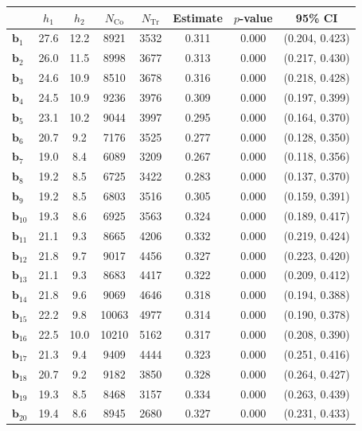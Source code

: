 \documentclass[10pt]{article}
\newcommand{\bb}{\mathbf{b}}
\begin{document}
\begin{table}[p]
    \centering
\begin{tabular}{lccccccc}
  \toprule\toprule
   & $h_1$ & $h_2$ & $N_{\mathrm{Co}}$ & $N_{\mathrm{Tr}}$ & Estimate & $p$-value & 95\% CI \\
  \midrule
   $\bb_{1}$ & 27.6 & 12.2 & 8921 & 3532 & 0.311 & 0.000 & (0.204, 0.423)\\
   $\bb_{2}$ & 26.0 & 11.5 & 8998 & 3677 & 0.313 & 0.000 & (0.217, 0.430)\\
   $\bb_{3}$ & 24.6 & 10.9 & 8510 & 3678 & 0.316 & 0.000 & (0.218, 0.428)\\
   $\bb_{4}$ & 24.5 & 10.9 & 9236 & 3976 & 0.309 & 0.000 & (0.197, 0.399)\\
   $\bb_{5}$ & 23.1 & 10.2 & 9044 & 3997 & 0.295 & 0.000 & (0.164, 0.370)\\
   $\bb_{6}$ & 20.7 & 9.2 & 7176 & 3525 & 0.277 & 0.000 & (0.128, 0.350)\\
   $\bb_{7}$ & 19.0 & 8.4 & 6089 & 3209 & 0.267 & 0.000 & (0.118, 0.356)\\
   $\bb_{8}$ & 19.2 & 8.5 & 6725 & 3422 & 0.283 & 0.000 & (0.137, 0.370)\\
   $\bb_{9}$ & 19.2 & 8.5 & 6803 & 3516 & 0.305 & 0.000 & (0.159, 0.391)\\
   $\bb_{10}$ & 19.3 & 8.6 & 6925 & 3563 & 0.324 & 0.000 & (0.189, 0.417)\\
   $\bb_{11}$ & 21.1 & 9.3 & 8665 & 4206 & 0.332 & 0.000 & (0.219, 0.424)\\
   $\bb_{12}$ & 21.8 & 9.7 & 9017 & 4456 & 0.327 & 0.000 & (0.223, 0.420)\\
   $\bb_{13}$ & 21.1 & 9.3 & 8683 & 4417 & 0.322 & 0.000 & (0.209, 0.412)\\
   $\bb_{14}$ & 21.8 & 9.6 & 9069 & 4646 & 0.318 & 0.000 & (0.194, 0.388)\\
   $\bb_{15}$ & 22.2 & 9.8 & 10063 & 4977 & 0.314 & 0.000 & (0.190, 0.378)\\
   $\bb_{16}$ & 22.5 & 10.0 & 10210 & 5162 & 0.317 & 0.000 & (0.208, 0.390)\\
   $\bb_{17}$ & 21.3 & 9.4 & 9409 & 4444 & 0.323 & 0.000 & (0.251, 0.416)\\
   $\bb_{18}$ & 20.7 & 9.2 & 9182 & 3850 & 0.328 & 0.000 & (0.264, 0.427)\\
   $\bb_{19}$ & 19.3 & 8.5 & 8468 & 3157 & 0.334 & 0.000 & (0.263, 0.439)\\
   $\bb_{20}$ & 19.4 & 8.6 & 8945 & 2680 & 0.327 & 0.000 & (0.231, 0.433)\\

\end{tabular}
\end{table}
\end{document}
